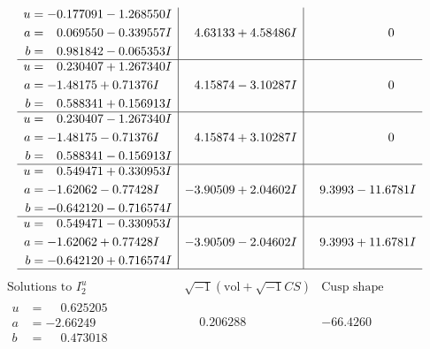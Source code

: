\documentclass[1p]{elsarticle_modified}
\theoremstyle{definition}
\newcommand{\I}{\sqrt{-1}}
\begin{document}
$$\begin{array}{c|c|c}
\begin{aligned}
u &= -0.177091 - 1.268550 I \\
a &= \phantom{-}0.069550 - 0.339557 I \\
b &= \phantom{-}0.981842 - 0.065353 I\end{aligned}
 & \phantom{-}4.63133 + 4.58486 I & \phantom{-0.000000 } 0 \\ \hline\begin{aligned}
u &= \phantom{-}0.230407 + 1.267340 I \\
a &= -1.48175 + 0.71376 I \\
b &= \phantom{-}0.588341 + 0.156913 I\end{aligned}
 & \phantom{-}4.15874 - 3.10287 I & \phantom{-0.000000 } 0 \\ \hline\begin{aligned}
u &= \phantom{-}0.230407 - 1.267340 I \\
a &= -1.48175 - 0.71376 I \\
b &= \phantom{-}0.588341 - 0.156913 I\end{aligned}
 & \phantom{-}4.15874 + 3.10287 I & \phantom{-0.000000 } 0 \\ \hline\begin{aligned}
u &= \phantom{-}0.549471 + 0.330953 I \\
a &= -1.62062 - 0.77428 I \\
b &= -0.642120 - 0.716574 I\end{aligned}
 & -3.90509 + 2.04602 I & \phantom{-}9.3993 - 11.6781 I \\ \hline\begin{aligned}
u &= \phantom{-}0.549471 - 0.330953 I \\
a &= -1.62062 + 0.77428 I \\
b &= -0.642120 + 0.716574 I\end{aligned}
 & -3.90509 - 2.04602 I & \phantom{-}9.3993 + 11.6781 I\\
 \hline 
 \end{array}$$\newpage$$\begin{array}{c|c|c}  
\text{Solutions to }I^u_{2}& \I (\text{vol} + \sqrt{-1}CS) & \text{Cusp shape}\\
 \hline 
\begin{aligned}
u &= \phantom{-}0.625205\phantom{ +0.000000I} \\
a &= -2.66249\phantom{ +0.000000I} \\
b &= \phantom{-}0.473018\phantom{ +0.000000I}\end{aligned}
 & \phantom{-}0.206288\phantom{ +0.000000I} & -66.4260\phantom{ +0.000000I} \\ \hline\begin{aligned}

\end{aligned}
\end{array}$$
\end{document}
